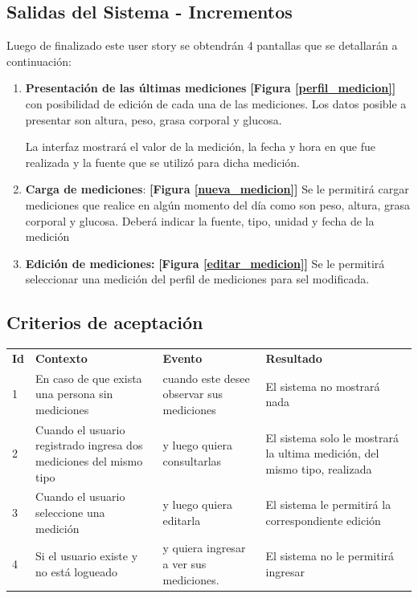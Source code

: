 \subsection {Salidas del Sistema - Incrementos}

Luego de finalizado este user story se obtendrán 4 pantallas que se detallarán a continuación:
\begin{enumerate}
    \item \textbf{Presentación de las últimas mediciones}  \textbf{[Figura  \ref{perfil_medicion}]} con posibilidad de edición de cada una de las mediciones. Los datos posible  a presentar son altura, peso, grasa corporal y glucosa. 
    
    La interfaz mostrará el valor de la medición, la fecha y hora en que fue realizada y la fuente que se utilizó para dicha medición.
	\item \textbf{Carga de mediciones}: \textbf{[Figura \ref{nueva_medicion}]} Se le permitirá cargar mediciones que realice en algún momento del día como son peso, altura, grasa corporal y glucosa. Deberá indicar la fuente, tipo, unidad y fecha de la medición
    \item \textbf{Edición de mediciones:}  \textbf{[Figura \ref{editar_medicion}]} Se le permitirá seleccionar una medición del perfil de mediciones para sel modificada.

\end{enumerate}

    




\subsection{Criterios de aceptación}

\begin{center}
\begin{longtable}{|p{0.5cm}|p{4cm}|p{4cm}|p{4.5cm}|}
\hline \hline \rowcolor[gray]{0.9}
	\multicolumn{4}{||c|}{\textbf{Criterio de aceptación}} \\
    \hline  \rowcolor[gray]{0.9}
        \textbf{Id} &
        \textbf{Contexto} &
        \textbf{Evento}&
        \textbf{Resultado} \\
    \hline
1&En caso de que exista una persona sin mediciones & cuando este desee observar sus mediciones  & El sistema no mostrará nada \\ \hline
 
2& Cuando el usuario registrado ingresa dos mediciones del mismo tipo  & y luego quiera consultarlas & El sistema solo le mostrará la ultima medición, del mismo tipo, realizada\\ \hline

3& Cuando el usuario seleccione una medición & y luego quiera editarla & El sistema le permitirá la correspondiente edición\\ \hline

4& Si el usuario existe y no está logueado & y quiera ingresar a ver sus mediciones. & El sistema no le permitirá ingresar\\ \hline
  \end{longtable}
\end{center}



